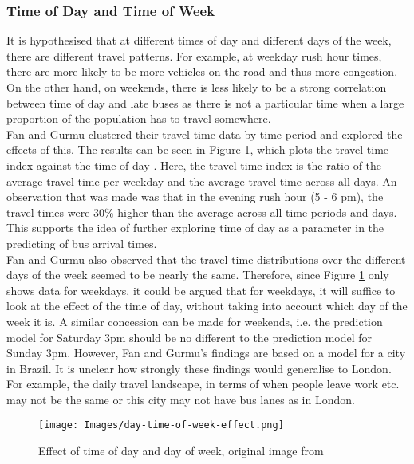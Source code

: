 \subsubsection{Time of Day and Time of Week}

It is hypothesised that at different times of day and different days of the week, there are different travel patterns. For example, at weekday rush hour times, there are more likely to be more vehicles on the road and thus more congestion. On the other hand, on weekends, there is less likely to be a strong correlation between time of day and late buses as there is not a particular time when a large proportion of the population has to travel somewhere. \\

Fan and Gurmu clustered their travel time data by time period and explored the effects of this. The results can be seen in Figure \ref{fig:time-of-day-week}, which plots the travel time index against the time of day \cite{dynamic-gps}. Here, the travel time index is the ratio of the average travel time per weekday and the average travel time across all days. An observation that was made was that in the evening rush hour (5 - 6 pm), the travel times were 30\% higher than the average across all time periods and days. This supports the idea of further exploring time of day as a parameter in the predicting of bus arrival times. \\

Fan and Gurmu also observed that the travel time distributions over the different days of the week seemed to be nearly the same. Therefore, since Figure \ref{fig:time-of-day-week} only shows data for weekdays, it could be argued that for weekdays, it will suffice to look at the effect of the time of day, without taking into account which day of the week it is. A similar concession can be made for weekends, i.e. the prediction model for Saturday 3pm should be no different to the prediction model for Sunday 3pm. However, Fan and Gurmu's findings are based on a model for a city in Brazil. It is unclear how strongly these findings would generalise to London. For example, the daily travel landscape, in terms of when people leave work etc. may not be the same or this city may not have bus lanes as in London.

\begin{figure}[H]
\begin{center}
    \texttt{[image: Images/day-time-of-week-effect.png]}
    \caption{Effect of time of day and day of week, original image from \cite{dynamic-gps}}
    \label{fig:time-of-day-week}
\end{center}
\end{figure}

